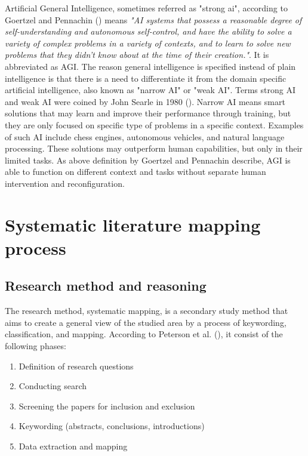 \documentclass[utf8,english]{gradu3}
\begin{document}


Artificial General Intelligence, sometimes referred as "strong ai", according to Goertzel and Pennachin (\cite*{goertzel2007}) means \emph{"AI systems that possess a reasonable degree of self-understanding and autonomous self-control, and have the ability to solve a variety of complex problems in a variety of contexts, and to learn to solve new problems that they didn't know about at the time of their creation."}. It is abbreviated as AGI. The reason general intelligence is specified instead of plain intelligence is that there is a need to differentiate it from the domain specific artificial intelligence, also known as "narrow AI" or "weak AI". Terms strong AI and weak AI were coined by John Searle in 1980 (\cite{searle1980}). Narrow AI means smart solutions that may learn and improve their performance through training, but they are only focused on specific type of problems in a specific context. Examples of such AI include chess engines, autonomous vehicles, and natural language processing. These solutions may outperform human capabilities, but only in their limited tasks.
As above definition by Goertzel and Pennachin describe, AGI is able to function on different context and tasks without separate human intervention and reconfiguration.

\chapter{Systematic literature mapping process}

\section{Research method and reasoning}

\label{method}
The research method, systematic mapping, is a secondary study method that aims to create a general view of the studied area by a process of keywording, classification, and mapping. According to Peterson et al. (\cite*{petersen2008}), it consist of the following phases:
\begin{enumerate}
    \item Definition of research questions
    \item Conducting search
    \item Screening the papers for inclusion and exclusion
    \item Keywording (abstracts, conclusions, introductions)
    \item Data extraction and mapping
\end{enumerate}
\end{document}
